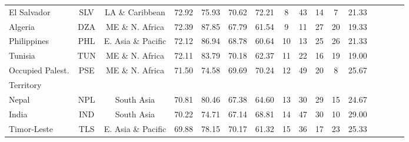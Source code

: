 \begin{singlespace}
{\begin{longtable}[H]{lccccccccccccccc}
El Salvador                       & SLV           & LA \& Caribbean    & 72.92       & 75.93            & 70.62                     & 72.21           & 8              & 43                  & 14                           & 7                  & 21.33                  \\
Algeria                           & DZA           & ME \& N. Africa    & 72.39       & 87.85            & 67.79                     & 61.54           & 9              & 11                  & 27                           & 20                 & 19.33                  \\
Philippines                       & PHL           & E. Asia \& Pacific & 72.12       & 86.94            & 68.78                     & 60.64           & 10             & 13                  & 25                           & 26                 & 21.33                  \\
Tunisia                           & TUN           & ME \& N. Africa    & 72.11       & 83.79            & 70.18                     & 62.37           & 11             & 22                  & 16                           & 19                 & 19.00                  \\
Occupied Palest.    & \multirow{2}{*}{PSE}           & \multirow{2}{*}{ME \& N. Africa}    & \multirow{2}{*}{71.50}       & \multirow{2}{*}{74.58}            & \multirow{2}{*}{69.69}                     & \multirow{2}{*}{70.24}           & \multirow{2}{*}{12}             & \multirow{2}{*}{49}                  & \multirow{2}{*}{20}                           & \multirow{2}{*}{8}                  & \multirow{2}{*}{25.67}                  \\
Territory \\
Nepal                             & NPL           & South Asia         & 70.81       & 80.46            & 67.38                     & 64.60           & 13             & 30                  & 29                           & 15                 & 24.67                  \\
India                             & IND           & South Asia         & 70.22       & 74.71            & 67.14                     & 68.81           & 14             & 47                  & 30                           & 10                 & 29.00                  \\
Timor-Leste                       & TLS           & E. Asia \& Pacific & 69.88       & 78.15            & 70.17                     & 61.32           & 15             & 36                  & 17                           & 23                 & 25.33                  \\

\end{longtable}}
\end{singlespace}
